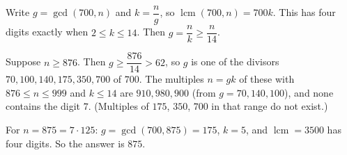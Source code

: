 Write $g=\gcd(700,n)$ and $k=\dfrac {n}{g}$, so $\operatorname{lcm}(700,n)=700k$. This has four digits exactly when $2\le k\le14$. Then $g=\dfrac {n}{k}\ge\dfrac {n}{14}$.

Suppose $n\ge876$. Then $g\ge\dfrac{876}{14}>62$, so $g$ is one of the divisors $70,100,140,175,350,700$ of $700$. The multiples $n=gk$ of these with $876\le n\le999$ and $k\le14$ are $910,980,900$ (from $g=70,140,100$), and none contains the digit $7$. (Multiples of $175$, $350$, $700$ in that range do not exist.)

For $n=875=7\cdot125$: $g=\gcd(700,875)=175$, $k=5$, and $\operatorname{lcm}=3500$ has four digits. So the answer is $\boxed{875}$.
